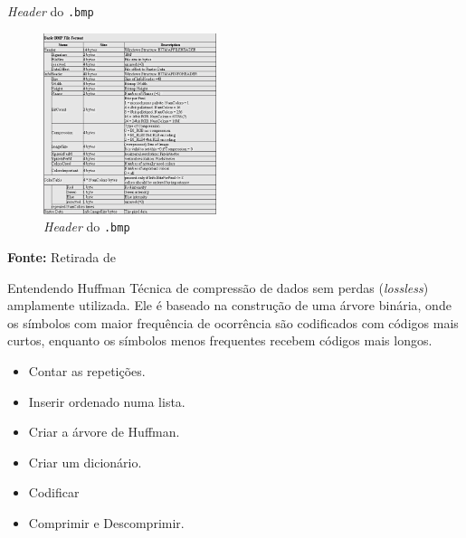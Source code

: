 \documentclass{beamer}
\begin{document}
    \begin{frame}{\textit{Header} do \texttt{.bmp}}
        \begin{figure}
            \centering
            \caption{\textit{Header} do \texttt{.bmp}} %
            \includegraphics[width=0.45\textwidth]{imagens/bmp_header.png}
        \end{figure}
        \vspace{2mm} %
        \centering
        \textbf{Fonte:} Retirada de \textcolor{blue}{~\cite{bmpfileformat}}%
    \end{frame}

    \begin{frame}{Entendendo Huffman}
        Técnica de compressão de dados sem perdas (\textit{lossless}) amplamente utilizada. Ele é baseado na construção de uma árvore binária, onde os símbolos com maior frequência de ocorrência são codificados com códigos mais curtos, enquanto os símbolos menos frequentes recebem códigos mais longos. 
        \begin{itemize}
            \item Contar as repetições. 
            \item Inserir ordenado numa lista. 
            \item Criar a árvore de Huffman. 
            \item Criar um dicionário.
            \item Codificar
            \item Comprimir e Descomprimir.
        \end{itemize}
    \end{frame} 
\end{document}
